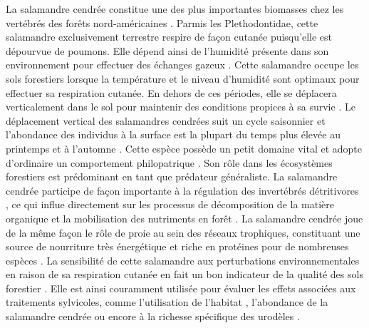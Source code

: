 La salamandre cendrée constitue une des plus importantes biomasses chez les vertébrés des forêts nord-américaines \citep{Burton1975Salamanderpopulations,Petranka1993Effectstimber,semlitschAbundanceBiomassProduction2014a}.
Parmis les Plethodontidae, cette salamandre exclusivement terrestre respire de façon cutanée puisqu'elle est dépourvue de poumons. 
Elle dépend ainsi de l'humidité présente dans son environnement pour effectuer des échanges gazeux \citep{Heatwole1961Relationsubstrate}. 
Cette salamandre occupe les sols forestiers lorsque la température et le niveau d'humidité sont optimaux pour effectuer sa respiration cutanée. 
En dehors de ces périodes, elle se déplacera verticalement dans le sol pour maintenir des conditions propices à sa survie \citep{Grizzell1949HibernationSite}.  
Le déplacement vertical des salamandres cendrées suit un cycle saisonnier et l’abondance des individus à la surface est la plupart du temps plus élevée au printemps et à l’automne \citep{FraserEmpiricalEvaluation1976,Jaeger1980MicrohabitatsTerrestrial}.
Cette espèce possède un petit domaine vital et adopte d’ordinaire un comportement philopatrique \citep{Yurewicz2004ResourceAvailability}.
Son rôle dans les écosystèmes forestiers est prédominant en tant que prédateur généraliste. 
La salamandre cendrée participe de façon importante à la régulation des invertébrés détritivores \citep{Burton1975Energyflow,Walton2013Topdownregulation,Hickerson2017Easternredbacked}, 
ce qui influe directement sur les processus de décomposition de la matière organique et la mobilisation des nutriments en forêt \citep{Burton1975Energyflow,Wyman1998Experimentalassessment}. 
La salamandre cendrée joue de la même façon le rôle de proie au sein des réseaux trophiques, constituant une source de nourriture très énergétique et riche en protéines pour de nombreuses espèces \citep{Burton1975Energyflow,Pough1987abundancesalamanders}.
La sensibilité de cette salamandre aux perturbations environnementales en raison de sa respiration cutanée en fait un bon indicateur de la qualité des sols forestier \citep{Welsh2001caseusing}.
Elle est ainsi couramment utilisée pour évaluer les effets associées aux traitements sylvicoles, comme l’utilisation de l’habitat \citep{Heatwole1962EnvironmentalFactors,gibbsDistributionWoodlandAmphibians1998,Baecher2018Environmentalgradients,Mossman2019Twosalamander}, 
l'abondance de la salamandre cendrée \citep{Harpole1999Effectsseven,Grialou2000effectsforest,Homyack2009Longtermeffects,Hocking2013Effectsexperimental,Mazerolle2021Woodlandsalamander} 
ou encore à la richesse spécifique des urodèles \citep{Petranka1993Effectstimber,Welsh2001caseusing}.

